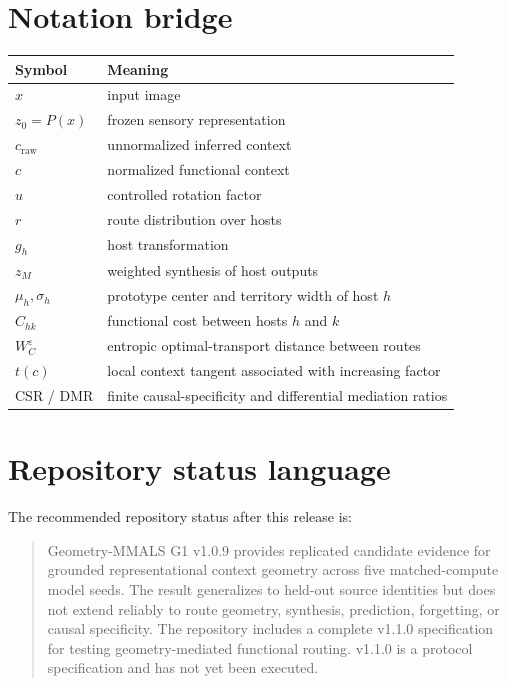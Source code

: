 \documentclass[11pt,a4paper]{article}
\begin{document}
\section{Notation bridge}

\begin{longtable}{@{}p{}p{}@{}}
\toprule
Symbol & Meaning\\
\midrule
$x$ & input image\\
$z_0=P(x)$ & frozen sensory representation\\
$c_{\mathrm{raw}}$ & unnormalized inferred context\\
$c$ & normalized functional context\\
$u$ & controlled rotation factor\\
$r$ & route distribution over hosts\\
$g_h$ & host transformation\\
$z_M$ & weighted synthesis of host outputs\\
$\mu_h,\sigma_h$ & prototype center and territory width of host $h$\\
$C_{hk}$ & functional cost between hosts $h$ and $k$\\
$W_C^\varepsilon$ & entropic optimal-transport distance between routes\\
$t(c)$ & local context tangent associated with increasing factor\\
CSR / DMR & finite causal-specificity and differential mediation ratios\\
\bottomrule
\end{longtable}

\section{Repository status language}

The recommended repository status after this release is:

\begin{quote}
Geometry-MMALS G1 v1.0.9 provides replicated candidate evidence for grounded representational context geometry across five matched-compute model seeds. The result generalizes to held-out source identities but does not extend reliably to route geometry, synthesis, prediction, forgetting, or causal specificity. The repository includes a complete v1.1.0 specification for testing geometry-mediated functional routing. v1.1.0 is a protocol specification and has not yet been executed.
\end{quote}

\printbibliography
\end{document}

